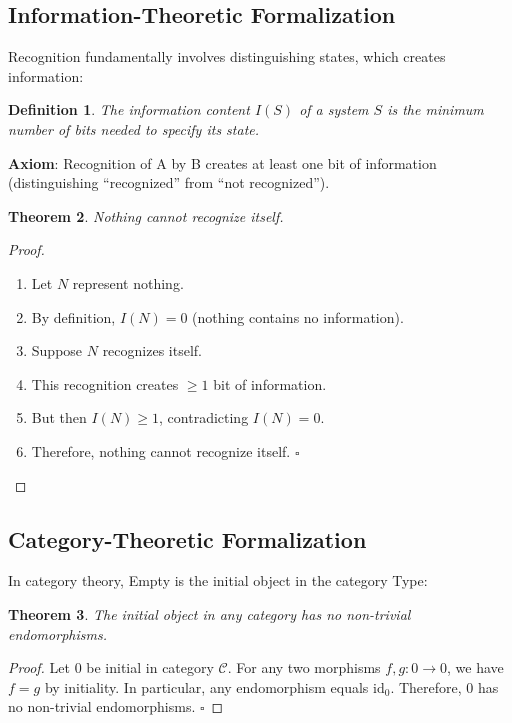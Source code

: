 \documentclass[12pt,a4paper]{article}
\newtheorem{theorem}{Theorem}
\newtheorem{definition}[theorem]{Definition}
\begin{document}
\subsection{Information-Theoretic Formalization}

Recognition fundamentally involves distinguishing states, which creates information:

\begin{definition}
The information content $I(S)$ of a system $S$ is the minimum number of bits needed to specify its state.
\end{definition}

\textbf{Axiom}: Recognition of A by B creates at least one bit of information (distinguishing ``recognized'' from ``not recognized'').

\begin{theorem}
Nothing cannot recognize itself.
\end{theorem}

\begin{proof}
\begin{enumerate}
\item Let $N$ represent nothing.
\item By definition, $I(N) = 0$ (nothing contains no information).
\item Suppose $N$ recognizes itself.
\item This recognition creates $\geq 1$ bit of information.
\item But then $I(N) \geq 1$, contradicting $I(N) = 0$.
\item Therefore, nothing cannot recognize itself. $\square$
\end{enumerate}
\end{proof}

\subsection{Category-Theoretic Formalization}

In category theory, Empty is the initial object in the category Type:

\begin{theorem}
The initial object in any category has no non-trivial endomorphisms.
\end{theorem}

\begin{proof}
Let $0$ be initial in category $\mathcal{C}$.
For any two morphisms $f,g : 0 \to 0$, we have $f = g$ by initiality.
In particular, any endomorphism equals $\text{id}_0$.
Therefore, $0$ has no non-trivial endomorphisms. $\square$
\end{proof}
\end{document}
